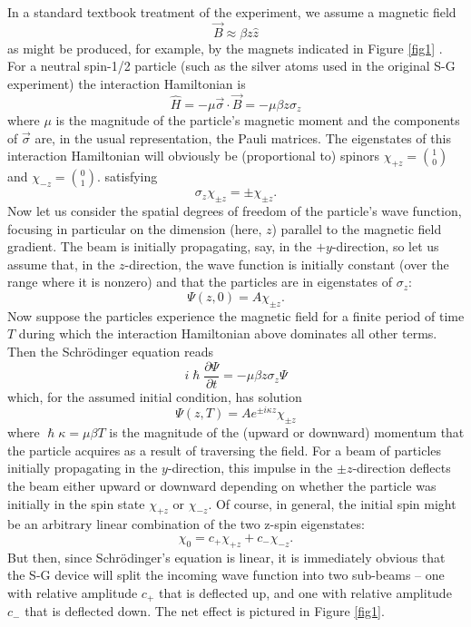 \documentclass[aps,prc,onecolumn,letterpaper,floatfix,12pt]{revtex4}
\renewcommand{\hbar}{\hslash}
\begin{document}
In a standard textbook treatment of the experiment, we assume a
magnetic field
\begin{equation}
\vec{B} \approx \beta z \hat{z}
\label{b}
\end{equation}
as might be produced, for example, by the magnets indicated in Figure
\ref{fig1} \cite{field}.  
For a neutral spin-1/2 particle (such as the
silver atoms used in the original S-G experiment) the interaction
Hamiltonian is
\begin{equation}
\hat{H} = - \mu \vec{\sigma} \cdot \vec{B} =  - \mu
\beta z \sigma_z
\label{h1}
\end{equation}
where $\mu$ is the magnitude of the particle's magnetic moment and
the components of $\vec{\sigma}$ are, in the usual representation, 
the Pauli matrices.  The eigenstates of this
interaction Hamiltonian will obviously be (proportional to) spinors 
$\chi_{+z} = \binom{1}{0}$ and $\chi_{-z} = \binom{0}{1}$.  
satisfying
\begin{equation}
\sigma_z \chi_{\pm z} = \pm \chi_{\pm z}.
\end{equation}
Now let us consider the spatial degrees of freedom of the particle's
wave function, focusing in particular on the dimension (here, $z$)
parallel to the magnetic field gradient.  The beam is initially
propagating, say, in the $+y$-direction, so let us assume that, in the
$z$-direction, the wave function is initially constant (over the range
where it is nonzero) and that the particles are in eigenstates of $\sigma_z$:
\begin{equation}
\Psi(z,0) = A \chi_{\pm z}.
\end{equation}
Now suppose the particles experience the magnetic field for a
finite period of time $T$ during which the interaction Hamiltonian
above dominates all other terms.  Then the Schr\"odinger equation
reads
\begin{equation}
i \hbar \frac{\partial \Psi}{\partial t} = - \mu \beta z \sigma_z \Psi
\end{equation}
which, for the assumed initial condition, has solution
\begin{equation}
\Psi(z,T)  = A e^{\pm i
  \kappa z} \chi_{\pm z} 
\end{equation}
where $\hbar \kappa = \mu \beta T$ is the magnitude of the (upward or
downward) momentum that the particle acquires as a result of
traversing the field.  For a
beam of particles initially propagating in the $y$-direction, this
impulse in the $\pm z$-direction deflects the beam either upward or
downward depending on whether the particle was initially in the spin
state $\chi_{+z}$ or $\chi_{-z}$.  Of course, in general, the initial spin
might be an arbitrary linear combination of the two z-spin
eigenstates:
\begin{equation}
\chi_0 = c_+ \chi_{+z} + c_- \chi_{-z}.
\label{spinor}
\end{equation}
But then, since Schr\"odinger's equation is linear, it is immediately
obvious that the S-G device will split the incoming wave function into
two sub-beams -- one with relative amplitude $c_+$ that is deflected
up, and one with relative amplitude $c_-$ that is deflected down.
The net effect is pictured in Figure \ref{fig1}.
\end{document}
